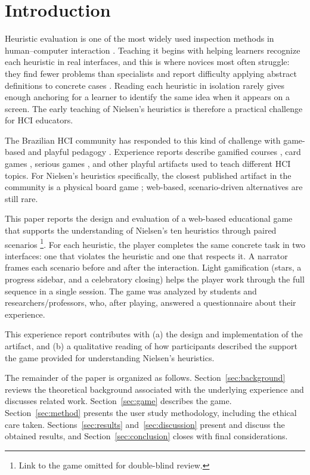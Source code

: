 \section{Introduction}
\label{sec:introduction}

Heuristic evaluation is one of the most widely used inspection methods in human--computer interaction \cite{nielsen1990heuristic,nielsen1994heuristic}. Teaching it begins with helping learners recognize each heuristic in real interfaces, and this is where novices most often struggle: they find fewer problems than specialists and report difficulty applying abstract definitions to concrete cases \cite{nielsen1992finding,abulfaraj2020detailed}. Reading each heuristic in isolation rarely gives enough anchoring for a learner to identify the same idea when it appears on a screen. The early teaching of Nielsen's heuristics is therefore a practical challenge for HCI educators.

The Brazilian HCI community has responded to this kind of challenge with game-based and playful pedagogy \cite{silveira2024praticas}. Experience reports describe gamified courses \cite{miranda2019gamificacao}, card games \cite{darin2019goople}, serious games \cite{sales2020jogosserios,guimaraes2022avaliacao}, and other playful artifacts \cite{santos2025ihcweek,rodrigues2025dossies} used to teach different HCI topics. For Nielsen's heuristics specifically, the closest published artifact in the community is a physical board game \cite{geremias2022desvendando}; web-based, scenario-driven alternatives are still rare.

This paper reports the design and evaluation of a web-based educational game that supports the understanding of Nielsen's ten heuristics through paired scenarios \footnote{Link to the game omitted for double-blind review.}. For each heuristic, the player completes the same concrete task in two interfaces: one that violates the heuristic and one that respects it. A narrator frames each scenario before and after the interaction. Light gamification (stars, a progress sidebar, and a celebratory closing) helps the player work through the full sequence in a single session. The game was analyzed by students and researchers/professors, who, after playing, answered a questionnaire about their experience. 

This experience report contributes with (a) the design and implementation of the artifact, and (b) a qualitative reading of how participants described the support the game provided for understanding Nielsen's heuristics. 

The remainder of the paper is organized as follows. Section~\ref{sec:background} reviews the theoretical background associated with the underlying experience and discusses related work. Section~\ref{sec:game} describes the game. Section~\ref{sec:method} presents the user study methodology, including the ethical care taken. Sections~\ref{sec:results} and~\ref{sec:discussion} present and discuss the obtained results, and Section~\ref{sec:conclusion} closes with final considerations.
